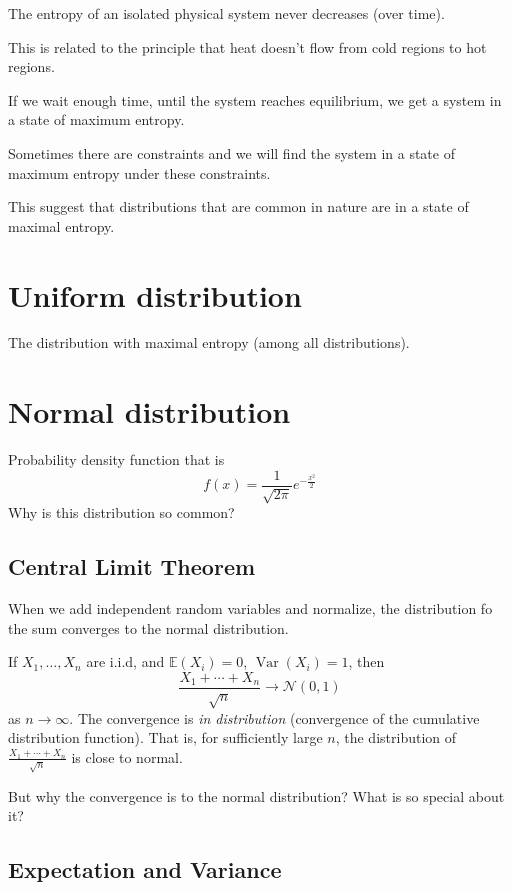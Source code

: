 \documentclass{article}
\begin{document}
The entropy of an isolated physical system never decreases (over time).

This is related to the principle that heat doesn't flow from cold regions to hot regions.

If we wait enough time, until the system reaches equilibrium, we get a system in a state of maximum entropy.

Sometimes there are constraints and we will find the system in a state of maximum entropy under these constraints.

This suggest that distributions that are common in nature are in a state of maximal entropy.

\section{Uniform distribution}

The distribution with maximal entropy (among all distributions).

\section{Normal distribution}

Probability density function that is 
\[
f(x) = \frac{1}{\sqrt{2 \pi}} e^{-\frac{x^2}{2}}
\]
Why is this distribution so common?

\subsection{Central Limit Theorem}

When we add independent random variables and normalize, the distribution fo the sum converges to the normal distribution.

If $X_1,\ldots, X_n$ are i.i.d, and $\mathbb{E}\left(X_i\right)=0$, $\operatorname{Var}\left(X_i\right)=1$, then 
\[
\frac{X_1 + \cdots + X_n}{\sqrt{n}} \to \mathcal{N}\left(0,1\right)
\]
as $n\to\infty$. The convergence is \textit{in distribution} (convergence of the cumulative distribution function). That is, for sufficiently large $n$, the distribution of $\frac{X_1 + \cdots + X_n}{\sqrt{n}}$ is close to normal.

But why the convergence is to the normal distribution? What is so special about it?

\subsection{Expectation and Variance}
\end{document}
